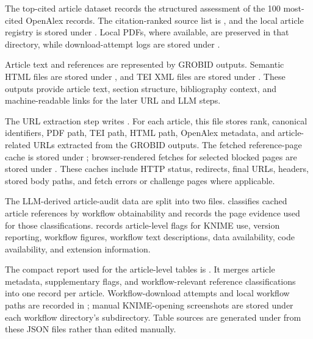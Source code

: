 \documentclass[runningheads]{llncs}
\begin{document}
The top-cited article dataset records the structured assessment of the 100
most-cited OpenAlex records. The citation-ranked source list is
, and the local
article registry is stored under . Local PDFs,
where available, are preserved in that directory, while download-attempt logs
are stored under .

Article text and references are represented by GROBID outputs. Semantic HTML
files are stored under , and TEI XML files are
stored under . These outputs provide
article text, section structure, bibliography context, and machine-readable
links for the later URL and LLM steps.

The URL extraction step writes
. For each article, this
file stores rank, canonical identifiers, PDF path, TEI path, HTML path,
OpenAlex metadata, and article-related URLs extracted from the GROBID outputs.
The fetched reference-page cache is stored under
; browser-rendered fetches for selected
blocked pages are stored under .
These caches include HTTP status, redirects, final URLs, headers, stored body
paths, and fetch errors or challenge pages where applicable.

The LLM-derived article-audit data are split into two files.
classifies cached article references by workflow obtainability and records the
page evidence used for those classifications.
 records
article-level flags for KNIME use, version reporting, workflow figures,
workflow text descriptions, data availability, code availability, and
extension information.

The compact report used for the article-level tables is
. It merges article
metadata, supplementary flags, and workflow-relevant reference classifications
into one record per article. Workflow-download attempts and local workflow
paths are recorded in
; manual
KNIME-opening screenshots are stored under each workflow directory's
 subdirectory. Table sources are generated under
 from these JSON files rather than edited manually.
\end{document}
